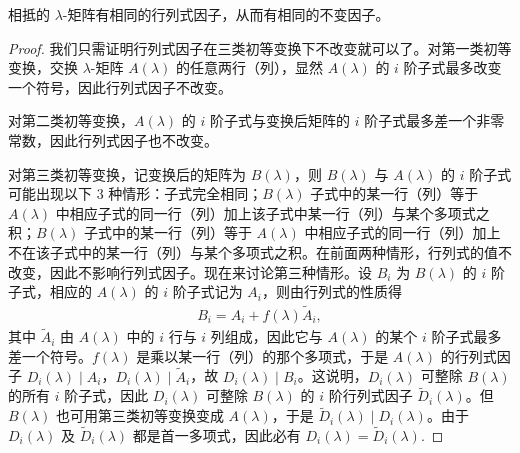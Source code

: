 \documentclass[../../main.tex]{subfiles}
\begin{document}
\begin{theorem}\label{theorem:相抵的lamda矩阵有相同的行列式因子和不变因子}
相抵的 $\lambda$-矩阵有相同的行列式因子，从而有相同的不变因子。
\end{theorem}
\begin{proof}
我们只需证明行列式因子在三类初等变换下不改变就可以了。对第一类初等变换，交换 $\lambda$-矩阵 $A(\lambda)$ 的任意两行（列），显然 $A(\lambda)$ 的 $i$ 阶子式最多改变一个符号，因此行列式因子不改变。

对第二类初等变换，$A(\lambda)$ 的 $i$ 阶子式与变换后矩阵的 $i$ 阶子式最多差一个非零常数，因此行列式因子也不改变。

对第三类初等变换，记变换后的矩阵为 $B(\lambda)$，则 $B(\lambda)$ 与 $A(\lambda)$ 的 $i$ 阶子式可能出现以下 3 种情形：子式完全相同；$B(\lambda)$ 子式中的某一行（列）等于 $A(\lambda)$ 中相应子式的同一行（列）加上该子式中某一行（列）与某个多项式之积；$B(\lambda)$ 子式中的某一行（列）等于 $A(\lambda)$ 中相应子式的同一行（列）加上不在该子式中的某一行（列）与某个多项式之积。在前面两种情形，行列式的值不改变，因此不影响行列式因子。现在来讨论第三种情形。设 $B_i$ 为 $B(\lambda)$ 的 $i$ 阶子式，相应的 $A(\lambda)$ 的 $i$ 阶子式记为 $A_i$，则由行列式的性质得
\begin{align*}
B_i = A_i + f(\lambda)\widetilde{A}_i,
\end{align*}
其中 $\widetilde{A}_i$ 由 $A(\lambda)$ 中的 $i$ 行与 $i$ 列组成，因此它与 $A(\lambda)$ 的某个 $i$ 阶子式最多差一个符号。$f(\lambda)$ 是乘以某一行（列）的那个多项式，于是 $A(\lambda)$ 的行列式因子 $D_i(\lambda)\mid A_i$，$D_i(\lambda)\mid\widetilde{A}_i$，故 $D_i(\lambda)\mid B_i$。这说明，$D_i(\lambda)$ 可整除 $B(\lambda)$ 的所有 $i$ 阶子式，因此 $D_i(\lambda)$ 可整除 $B(\lambda)$ 的 $i$ 阶行列式因子 $\widetilde{D}_i(\lambda)$。但 $B(\lambda)$ 也可用第三类初等变换变成 $A(\lambda)$，于是 $\widetilde{D}_i(\lambda)\mid D_i(\lambda)$。由于 $D_i(\lambda)$ 及 $\widetilde{D}_i(\lambda)$ 都是首一多项式，因此必有 $D_i(\lambda)=\widetilde{D}_i(\lambda)$.

\end{proof}
\end{document}
